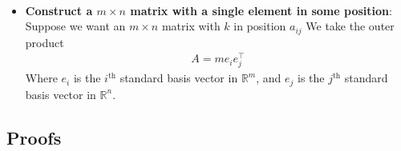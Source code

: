 \documentclass{report}
\begin{document}
\begin{itemize}
\begin{align*}
            \end{align*}
        \item \textbf{Construct a $m\times n$ matrix with a single element in some position}: Suppose we want an $m\times n$ matrix with $k$ in position $a_{ij}$ We take the outer product
            \begin{align*}
               A = me_{i}e_{j}^{\top}
            \end{align*}
            Where $e_{i}$ is the $i^{\text{th}} $ standard basis vector in $\mathbb{R}^{m}$, and $e_{j}$ is the $j^{\text{th}}$ standard basis vector in $\mathbb{R}^{n}$.

    \end{itemize}


    \pagebreak 
    \subsection{Proofs}
    \bigbreak \noindent 
\end{document}
